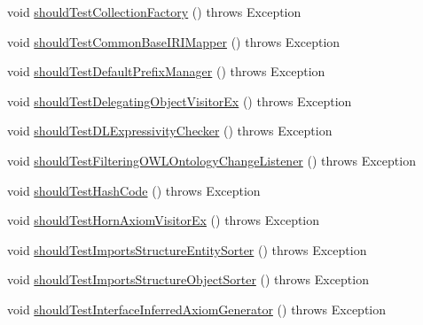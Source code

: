\begin{DoxyCompactItemize}
void \hyperlink{classorg_1_1semanticweb_1_1owlapi_1_1contract_1_1_contract_owlapi_util_test_ae47416a5a7972ac431999e960d6dbb1f}{should\-Test\-Collection\-Factory} ()  throws Exception 
\item 
void \hyperlink{classorg_1_1semanticweb_1_1owlapi_1_1contract_1_1_contract_owlapi_util_test_af886c976c7cd0e85559c39a0583590b9}{should\-Test\-Common\-Base\-I\-R\-I\-Mapper} ()  throws Exception 
\item 
void \hyperlink{classorg_1_1semanticweb_1_1owlapi_1_1contract_1_1_contract_owlapi_util_test_a71e45c067cd3bab3ffec17dbbb838605}{should\-Test\-Default\-Prefix\-Manager} ()  throws Exception 
\item 
void \hyperlink{classorg_1_1semanticweb_1_1owlapi_1_1contract_1_1_contract_owlapi_util_test_ad88c5cc72cf65f262aeafda30c560148}{should\-Test\-Delegating\-Object\-Visitor\-Ex} ()  throws Exception 
\item 
void \hyperlink{classorg_1_1semanticweb_1_1owlapi_1_1contract_1_1_contract_owlapi_util_test_a74d455fa93b2d6aeb320038537d41a9a}{should\-Test\-D\-L\-Expressivity\-Checker} ()  throws Exception 
\item 
void \hyperlink{classorg_1_1semanticweb_1_1owlapi_1_1contract_1_1_contract_owlapi_util_test_ae2a33cc0511641e5163a045c2db493f4}{should\-Test\-Filtering\-O\-W\-L\-Ontology\-Change\-Listener} ()  throws Exception 
\item 
void \hyperlink{classorg_1_1semanticweb_1_1owlapi_1_1contract_1_1_contract_owlapi_util_test_a2977dbacd5d5ded67e59fec3f12b2ad8}{should\-Test\-Hash\-Code} ()  throws Exception 
\item 
void \hyperlink{classorg_1_1semanticweb_1_1owlapi_1_1contract_1_1_contract_owlapi_util_test_ad4d0abb11fc1b3227a7b03b7741645ef}{should\-Test\-Horn\-Axiom\-Visitor\-Ex} ()  throws Exception 
\item 
void \hyperlink{classorg_1_1semanticweb_1_1owlapi_1_1contract_1_1_contract_owlapi_util_test_ad7b25d288cd69957fc8275d18d2a7f84}{should\-Test\-Imports\-Structure\-Entity\-Sorter} ()  throws Exception 
\item 
void \hyperlink{classorg_1_1semanticweb_1_1owlapi_1_1contract_1_1_contract_owlapi_util_test_aaf2290c4a370e8aac33bcaf589473410}{should\-Test\-Imports\-Structure\-Object\-Sorter} ()  throws Exception 
\item 
void \hyperlink{classorg_1_1semanticweb_1_1owlapi_1_1contract_1_1_contract_owlapi_util_test_ac104cfdd8ce416650835ad1585023eac}{should\-Test\-Interface\-Inferred\-Axiom\-Generator} ()  throws Exception 

\end{DoxyCompactItemize}
